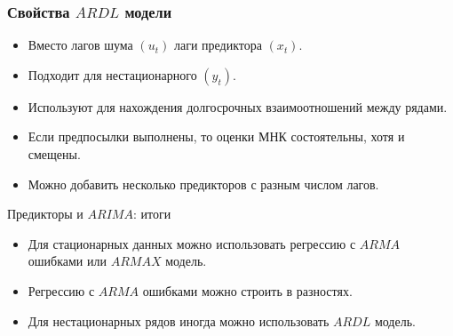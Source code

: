 \begin{frame}
  \frametitle{Свойства $ARDL$ модели}
  \begin{itemize}[<+->]
    \item Вместо лагов шума $(u_t)$ \alert{лаги предиктора} $(x_t)$.
    \item Подходит для \alert{нестационарного} $(y_t)$.
    \item Используют для нахождения \alert{долгосрочных взаимоотношений} между рядами.
    \item Если предпосылки выполнены, то \alert{оценки МНК состоятельны}, хотя и смещены. 
    \item Можно добавить \alert{несколько предикторов} с разным числом лагов. 
  \end{itemize}

\end{frame}


\begin{frame}{Предикторы и $ARIMA$: итоги}
  \begin{itemize}[<+->]
    \item Для \alert{стационарных данных} можно использовать регрессию с $ARMA$ ошибками или $ARMAX$ модель. 
    \item Регрессию с $ARMA$ ошибками можно строить \alert{в разностях}.
    \item Для \alert{нестационарных рядов} иногда можно использовать $ARDL$ модель. 
  \end{itemize}

\end{frame}
